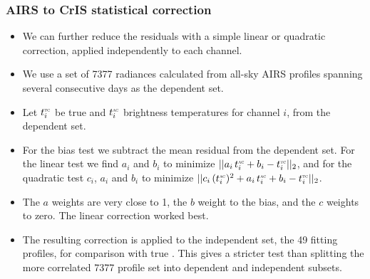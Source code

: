 \documentclass[10pt]{beamer}
\begin{document}
\begin{frame}
\frametitle{AIRS to CrIS statistical correction}
\begin{itemize}

  \item We can further reduce the residuals with a simple linear or
    quadratic correction, applied independently to each channel.

  \item We use a set of 7377 radiances calculated from all-sky AIRS
    profiles spanning several consecutive days as the dependent set.

  \item Let $t^{\mbox{\tiny\textsc{tc}}}_i$ be true {\cris} and $t^{\mbox{\tiny\textsc{ac}}}_i$ {\airs} {\cris}
    brightness temperatures for {\cris} channel $i$, from the
    dependent set.

  \item For the bias test we subtract the mean residual from the
    dependent set.  For the linear test we find $a_i$ and $b_i$ to
    minimize $||a_i\,t^{\mbox{\tiny\textsc{ac}}}_i + b_i - t^{\mbox{\tiny\textsc{tc}}}_i||_2$, and for the
    quadratic test $c_i$, $a_i$ and $b_i$ to minimize
    $||c_i\,(t^{\mbox{\tiny\textsc{ac}}}_i)^2 + a_i\,t^{\mbox{\tiny\textsc{ac}}}_i + b_i - t^{\mbox{\tiny\textsc{tc}}}_i||_2$.

  \item The $a$ weights are very close to 1, the $b$ weight to the
    bias, and the $c$ weights to zero.  The linear correction worked
    best.

  \item The resulting correction is applied to the independent set,
    the 49 fitting profiles, for comparison with true {\cris}.  This
    gives a stricter test than splitting the more correlated 7377
    profile set into dependent and independent subsets.

\end{itemize}
\end{frame}
\end{document}

